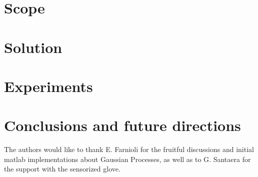 \documentclass[twocolumn,draft,natbib]{svjour3}
\begin{document}
\section{Scope}
\label{sec:scope}



\section{Solution}
\label{sec:solution}



\section{Experiments}
\label{sec:experiments}



\section{Conclusions and future directions}
\label{sec:conclusions}


\begin{acknowledgements}
The authors would like to thank E. Farnioli for the fruitful discussions and 
initial matlab implementations about Gaussian Processes, as well as to G. 
Santaera for the support with the sensorized glove.
\end{acknowledgements}



\end{document}
